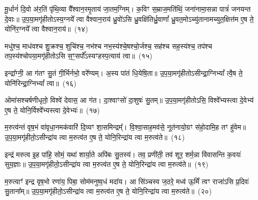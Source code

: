 {\anuvakamend[{उ॒प॒या॒मगृ॑हीतो॒ द्वाविꣳ॑शतिः}]}%

मू॒र्धानं॑ दि॒वो अ॑र॒तिं पृ॑थि॒व्या वै᳚श्वान॒रमृ॒ताय॑ जा॒तम॒ग्निम्। क॒विꣳ स॒म्राज॒मति॑थिं॒ जना॑नामा॒सन्ना पात्रं॑ जनयन्त दे॒वाः॥ उ॒प॒या॒मगृ॑हीतो\-ऽस्य॒ग्नये᳚ त्वा वैश्वान॒राय॑ ध्रु॒वो॑\-ऽसि ध्रु॒वक्षि॑तिर्ध्रु॒वाणां᳚ ध्रु॒वत॒मो\-ऽच्यु॑तानामच्युत॒क्षित्त॑म ए॒ष ते॒ योनि॑र॒ग्नये᳚ त्वा वैश्वान॒राय॑॥~(१४)

{\anuvakamend[{मू॒र्धानं॒ पञ्च॑त्रिꣳशत्}]}%

मधु॑श्च॒ माध॑वश्च शु॒क्रश्च॒ शुचि॑श्च॒ नभ॑श्च नभ॒स्य॑श्चे॒षश्चो॒र्जश्च॒ सह॑श्च सह॒स्य॑श्च॒ तप॑श्च तप॒स्य॑श्चोपया॒मगृ॑हीतो\-ऽसि स॒ꣳ॒सर्पो᳚\-ऽस्यꣳहस्प॒त्याय॑ त्वा॥~(१५)

{\anuvakamend[{मधु॑स्त्रि॒ꣳ॒शत्}]}%

इन्द्रा᳚ग्नी॒ आ ग॑तꣳ सु॒तं गी॒र्भिर्नभो॒ वरे᳚ण्यम्। अ॒स्य पा॑तं धि॒येषि॒ता॥ उ॒प॒या॒मगृ॑हीतो\-ऽसीन्द्रा॒ग्नि\-भ्यां᳚ त्वै॒ष ते॒ योनि॑रिन्द्रा॒ग्नि\-भ्यां᳚ त्वा॥~(१६)

{\anuvakamend[{इन्द्रा᳚ग्नी विꣳश॒तिः}]}%

ओमा॑सश्चर्\mbox{}षणीधृतो॒ विश्वे॑ देवास॒ आ ग॑त। दा॒श्वाꣳसो॑ दा॒शुषः॑ सु॒तम्॥ उ॒प॒या॒मगृ॑हीतो\-ऽसि॒ विश्वे᳚भ्यस्त्वा दे॒वेभ्य॑ ए॒ष ते॒ योनि॒र्विश्वे᳚भ्यस्त्वा दे॒वेभ्यः॑॥~(१७)

{\anuvakamend[{इन्द्रा᳚ग्नी॒ ओमा॑सो विꣳश॒तिर्विꣳ॑शतिः}]}%

म॒रुत्व॑न्तं वृष॒भं वा॑वृधा॒नमक॑वारिं दि॒व्यꣳ शा॒समिन्द्रम्᳚। वि॒श्वा॒साह॒मव॑से॒ नूत॑नायो॒ग्रꣳ स॑हो॒दामि॒ह तꣳ हु॑वेम॥ उ॒प॒या॒मगृ॑हीतो॒\-ऽसीन्द्रा॑य त्वा म॒रुत्व॑त ए॒ष ते॒ योनि॒रिन्द्रा॑य त्वा म॒रुत्व॑ते॥~(१८)

{\anuvakamend[{म॒रुत्व॑न्त॒ꣳ॒ षड्विꣳ॑शतिः}]}%

इन्द्र॑ मरुत्व इ॒ह पा॑हि॒ सोमं॒ यथा॑ शार्या॒ते अपि॑बः सु॒तस्य॑। तव॒ प्रणी॑ती॒ तव॑ शूर॒ शर्म॒न्ना वि॑वासन्ति क॒वयः॑ सुय॒ज्ञाः॥ उ॒प॒या॒मगृ॑हीतो॒\-ऽसीन्द्रा॑य त्वा म॒रुत्व॑त ए॒ष ते॒ योनि॒रिन्द्रा॑य त्वा म॒रुत्व॑ते॥~(१९)

{\anuvakamend[{इन्द्रैका॒न्नत्रि॒ꣳ॒शत्}]}%

म॒रुत्वाꣳ॑ इन्द्र वृष॒भो रणा॑य॒ पिबा॒ सोम॑मनुष्व॒धं मदा॑य। आ सि॑ञ्चस्व ज॒ठरे॒ मध्व॑ ऊ॒र्मिं त्वꣳ राजा॑ऽसि प्र॒दिवः॑ सु॒ताना᳚म्॥ उ॒प॒या॒मगृ॑हीतो॒\-ऽसीन्द्रा॑य त्वा म॒रुत्व॑त ए॒ष ते॒ योनि॒रिन्द्रा॑य त्वा म॒रुत्व॑ते॥~(२०)

{\anuvakamend[{इन्द्र॑ मरुत्वो म॒रुत्वा॒नेका॒न्न त्रि॒ꣳ॒शदेका॒न्न त्रि॒ꣳ॒शत्}]}%

